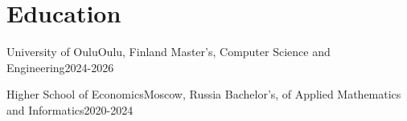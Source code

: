 \section{Education}
\resumeSubHeadingListStart
  \resumeEduSubheading
       {University of Oulu}{Oulu, Finland}
      {Master's, Computer Science and Engineering}{2024-2026}
      \resumeDesc{
        \vspace{7pt}
      }
	 
    \resumeEduSubheading
       {Higher School of Economics}{Moscow, Russia}
      {Bachelor's, of Applied Mathematics and Informatics}{2020-2024}
     

\resumeSubHeadingListEnd
